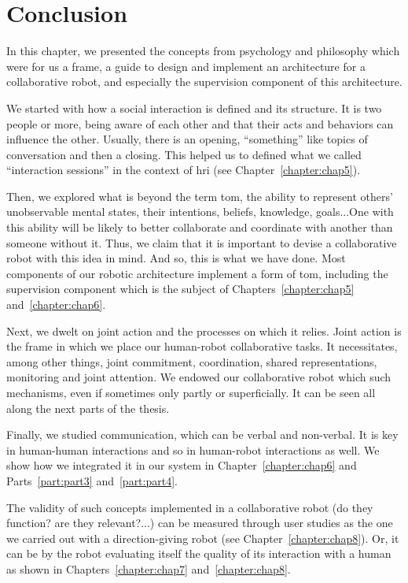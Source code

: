 \documentclass[a4paper,11pt,twoside]{StyleThese}
\begin{document}
\section{Conclusion}

In this chapter, we presented the concepts from psychology and philosophy which were for us a frame, a guide to design and implement an architecture for a collaborative robot, and especially the supervision component of this architecture. 

We started with how a social interaction is defined and its structure. It is two people or more, being aware of each other and that their acts and behaviors can influence the other. Usually, there is an opening, ``something'' like topics of conversation and then a closing. This helped us to defined what we called ``interaction sessions'' in the context of \acrshort{hri} (see Chapter~\ref{chapter:chap5}). 

Then, we explored what is beyond the term \acrfull{tom}, the ability to represent others' unobservable mental states, \ie their intentions, beliefs, knowledge, goals...One with this ability will be likely to better collaborate and coordinate with another than someone without it. Thus, we claim that it is important to devise a collaborative robot with this idea in mind. And so, this is what we have done. Most components of our robotic architecture implement a form of \acrshort{tom}, including the supervision component which is the subject of Chapters~\ref{chapter:chap5} and~\ref{chapter:chap6}.

Next, we dwelt on joint action and the processes on which it relies. Joint action is the frame in which we place our human-robot collaborative tasks. It necessitates, among other things, joint commitment, coordination, shared representations, monitoring and joint attention. We endowed our collaborative robot which such mechanisms, even if sometimes only partly or superficially. It can be seen all along the next parts of the thesis.

Finally, we studied communication, which can be verbal and non-verbal. It is key in human-human interactions and so in human-robot interactions as well. We show how we integrated it in our system in Chapter~\ref{chapter:chap6} and Parts~\ref{part:part3} and~\ref{part:part4}.

The validity of such concepts implemented in a collaborative robot (do they function? are they relevant?...) can be measured through user studies as the one we carried out with a direction-giving robot (see Chapter~\ref{chapter:chap8}). Or, it can be by the robot evaluating itself the quality of its interaction with a human as shown in Chapters~\ref{chapter:chap7} and~\ref{chapter:chap8}. 

\ifdefined{}
\else


\end{document}
